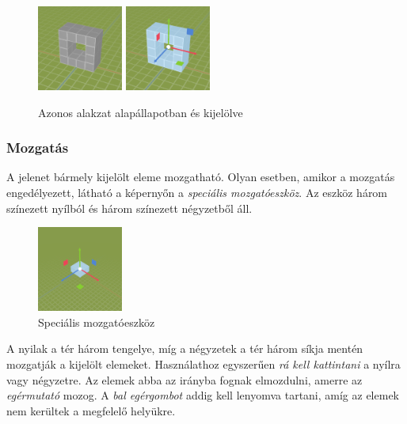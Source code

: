 \begin{figure}[h]
    \centering
    \includegraphics[width=0.25\textwidth]{parts/user-documentation/editor/images/unselected.png}
    \includegraphics[width=0.25\textwidth]{parts/user-documentation/editor/images/selected.png}
    \caption{Azonos alakzat alapállapotban és kijelölve}
\end{figure}

\subsubsection{Mozgatás}

A jelenet bármely kijelölt eleme mozgatható. Olyan esetben, amikor a mozgatás engedélyezett,
látható a képernyőn a \emph{speciális mozgatóeszköz}. Az eszköz három színezett nyílból és három
színezett négyzetből áll.

\begin{figure}[h]
    \centering
    \includegraphics[width=0.25\textwidth]{parts/user-documentation/editor/images/move_gizmo.png}
    \caption{Speciális mozgatóeszköz}
\end{figure}

A nyilak a tér három tengelye, míg a négyzetek a tér három síkja mentén
mozgatják a kijelölt elemeket. Használathoz egyszerűen \emph{rá kell kattintani} a nyílra vagy
négyzetre. Az elemek abba az irányba fognak elmozdulni, amerre az \emph{egérmutató} mozog. A
\emph{bal egérgombot} addig kell lenyomva tartani, amíg az elemek nem kerültek a megfelelő helyükre.

